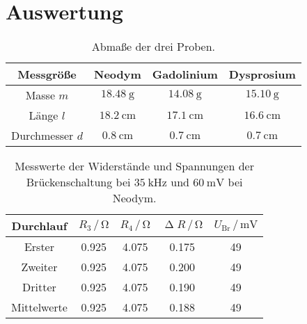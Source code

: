 \section{Auswertung}
\label{sec:Auswertung}

\begin{table}[H]
  \centering
  \caption{Abmaße der drei Proben.}
  \label{tab:abmProben}
  \begin{tabular}{c c c c}
    \toprule
    Messgröße & Neodym & Gadolinium & Dysprosium \\
    \midrule
    Masse $m$ & $\SI{18.48}{\gram}$ & $\SI{14.08}{\gram}$ & $\SI{15.10}{\gram}$ \\
    Länge $l$ & $\SI{18.2}{\centi\meter}$ & $\SI{17.1}{\centi\meter}$ & $\SI{16.6}{\centi\meter}$ \\ %
    Durchmesser $d$ & $\SI{0.8}{\centi\meter}$ & $\SI{0.7}{\centi\meter}$ & $\SI{0.7}{\centi\meter}$ \\
    \bottomrule
  \end{tabular}
\end{table}


\begin{table}[H]
  \centering
  \caption{Messwerte der Widerstände und Spannungen der Brückenschaltung bei $\SI{35}{\kilo\hertz}$ und $\SI{60}{\milli\volt}$ bei Neodym.}
  \label{tab:abmProben}
  \begin{tabular}{c| c c c c}
    \toprule
    Durchlauf & $R_3 \,/\, \si{\ohm}$ & $R_4 \,/\, \si{\ohm}$ & $\upDelta R \,/\, \si{\ohm}$ & $U_{\text{Br}} \,/\, \si{\milli\volt}$ \\%
    \midrule
    Erster & 0.925 & 4.075 & 0.175 & 49 \\
    Zweiter & 0.925 & 4.075 & 0.200 & 49 \\
    Dritter & 0.925 & 4.075 & 0.190 & 49 \\
    Mittelwerte & 0.925 & 4.075 & 0.188 & 49\\
    \bottomrule
  \end{tabular}
\end{table}

